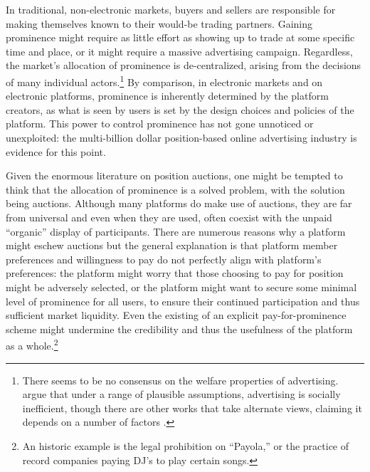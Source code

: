 In traditional, non-electronic markets, buyers and sellers are
responsible for making themselves known to their would-be trading
partners. Gaining prominence might require as little effort as showing
up to trade at some specific time and place, or it might require a
massive advertising campaign. Regardless, the market's allocation of
prominence is de-centralized, arising from the decisions of many
individual actors.\footnote{There seems to be no consensus on the
  welfare properties of advertising. \cite{dixit1978advertising} argue
  that under a range of plausible assumptions, advertising is socially
  inefficient, though there are other works that take alternate views,
  claiming it depends on a number of factors
  \citep{becker1993simple}.}  By comparison, in electronic markets and
on electronic platforms, prominence is inherently determined by the
platform creators, as what is seen by users is set by the design
choices and policies of the platform. This power to control prominence
has not gone unnoticed or unexploited: the multi-billion dollar
position-based online advertising industry
\citep{varian2007position,edelman2005internet} is evidence for this
point.

Given the enormous literature on position auctions, one might be
tempted to think that the allocation of prominence is a solved
problem, with the solution being auctions. Although many platforms do
make use of auctions, they are far from universal and even when they
are used, often coexist with the unpaid ``organic'' display of
participants. There are numerous reasons why a platform might eschew
auctions but the general explanation is that platform member
preferences and willingness to pay do not perfectly align with
platform's preferences: the platform might worry that those choosing
to pay for position might be adversely selected, or the platform might
want to secure some minimal level of prominence for all users, to
ensure their continued participation and thus sufficient market
liquidity.  Even the existing of an explicit pay-for-prominence scheme
might undermine the credibility and thus the usefulness of the
platform as a whole.\footnote{An historic example is the legal
  prohibition on ``Payola,'' or the practice of record companies
  paying DJ's to play certain songs.} 



